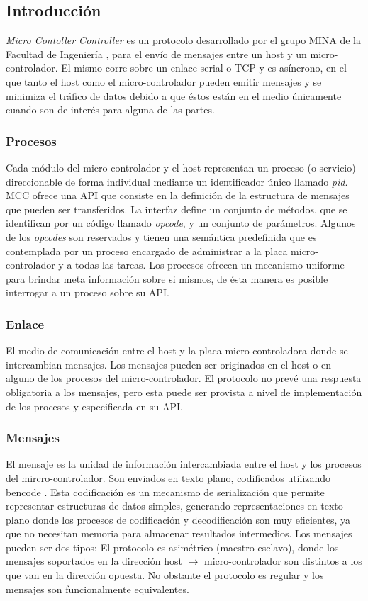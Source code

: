 \documentclass[withindex,glossary]{cam-thesis}
\begin{document}
\subsection{Introducción}
\textit{Micro Contoller Controller} es un protocolo desarrollado por el grupo MINA de la Facultad de Ingeniería \cite{GRUPOMINA}, para el envío de mensajes entre un host y un micro-controlador. El mismo corre sobre un enlace serial o TCP y es asíncrono, en el que tanto el host como el micro-controlador pueden emitir mensajes y se minimiza el tráfico de datos debido a que éstos están en el medio únicamente cuando son de interés para alguna de las partes. 

\subsubsection{Procesos}
Cada módulo del micro-controlador y el host representan un proceso (o servicio) direccionable de forma individual mediante un identificador único llamado \textit{pid}.
MCC ofrece una API que consiste en la definición de la estructura de mensajes que pueden ser transferidos. La interfaz define un conjunto de métodos, que se identifican por un código llamado \textit{opcode}, y un conjunto de parámetros. 
Algunos de los \textit{opcodes} son reservados y tienen una semántica predefinida que es contemplada por un proceso encargado de administrar a la placa micro-controlador y a todas las tareas. 
Los procesos ofrecen un mecanismo uniforme para brindar meta información sobre si mismos, de ésta manera es posible interrogar a un proceso sobre su API.

\subsubsection{Enlace}
El medio de comunicación entre el host y la placa micro-controladora donde se intercambian mensajes.
Los mensajes pueden ser originados en el host o en alguno de los procesos del micro-controlador. El protocolo no prevé una respuesta obligatoria a los mensajes, pero esta puede ser provista a nivel de implementación de los procesos y especificada en su API.

\subsubsection{Mensajes}
El mensaje es la unidad de información intercambiada entre el host y los procesos del mircro-controlador. Son enviados en texto plano, codificados utilizando bencode \cite{BENCODE}. Esta codificación es un mecanismo de serialización que permite representar estructuras de datos simples, generando representaciones en texto plano donde los procesos de codificación y decodificación son muy eficientes, ya que no necesitan memoria para almacenar resultados intermedios.
Los mensajes pueden ser dos tipos:
El protocolo es asimétrico (maestro-esclavo), donde los mensajes soportados en la dirección host $\rightarrow$ micro-controlador son distintos a los que van en la dirección opuesta. No obstante el protocolo es regular y los mensajes son funcionalmente equivalentes.
\end{document}
